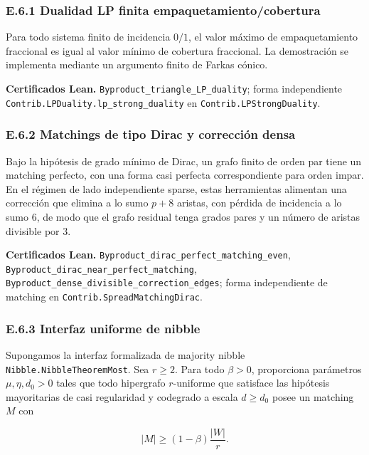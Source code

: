 \documentclass[
  spanish,
  11pt,
  a4paper,
]{article}
\begin{document}
\subsubsection{E.6.1 Dualidad LP finita empaquetamiento/cobertura}\label{e.6.1-dualidad-lp-finita-empaquetamientocobertura}

Para todo sistema finito de incidencia \(0/1\), el valor máximo de empaquetamiento fraccional es igual al valor mínimo de cobertura fraccional. La demostración se implementa mediante un argumento finito de Farkas cónico.

\textbf{Certificados Lean.} \texttt{Byproduct\_triangle\_LP\_duality}; forma independiente \texttt{Contrib.LPDuality.lp\_strong\_duality} en \texttt{Contrib.LPStrongDuality}.

\subsubsection{E.6.2 Matchings de tipo Dirac y corrección densa}\label{e.6.2-matchings-de-tipo-dirac-y-correcciuxf3n-densa}

Bajo la hipótesis de grado mínimo de Dirac, un grafo finito de orden par tiene un matching perfecto, con una forma casi perfecta correspondiente para orden impar. En el régimen de lado independiente sparse, estas herramientas alimentan una corrección que elimina a lo sumo \(p+8\) aristas, con pérdida de incidencia a lo sumo \(6\), de modo que el grafo residual tenga grados pares y un número de aristas divisible por \(3\).

\textbf{Certificados Lean.} \texttt{Byproduct\_dirac\_perfect\_matching\_even}, \texttt{Byproduct\_dirac\_near\_perfect\_matching}, \texttt{Byproduct\_dense\_divisible\_correction\_edges}; forma independiente de matching en \texttt{Contrib.SpreadMatchingDirac}.

\subsubsection{E.6.3 Interfaz uniforme de nibble}\label{e.6.3-interfaz-uniforme-de-nibble}

Supongamos la interfaz formalizada de majority nibble \texttt{Nibble.NibbleTheoremMost}. Sea \(r\ge2\). Para todo \(\beta>0\), proporciona parámetros \(\mu,\eta,d_0>0\) tales que todo hipergrafo \(r\)-uniforme que satisface las hipótesis mayoritarias de casi regularidad y codegrado a escala \(d\ge d_0\) posee un matching \(M\) con

\[|M|\ge(1-\beta)\frac{|W|}{r}.\]
\end{document}
